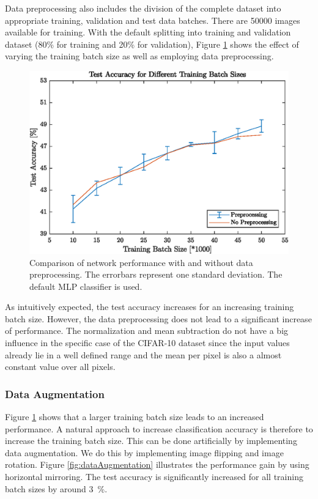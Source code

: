   	Data preprocessing also includes the division of the complete dataset into appropriate training, validation and test data batches. There are 50000 images available for training. With the default splitting into training and validation dataset (80\% for training and 20\% for validation), Figure \ref{fig:dataPreprocessing} shows the effect of varying the training batch size as well as employing data preprocessing.

  	\begin{figure}
  		\centering
   		\includegraphics{images/dataPreprocessing}
   		\caption{Comparison of network performance with and without data preprocessing. The errorbars represent one standard deviation. The default MLP classifier is used.}
   		\label{fig:dataPreprocessing}
   	\end{figure}

   	As intuitively expected, the test accuracy increases for an increasing training batch size. However, the data preprocessing does not lead to a significant increase of performance. The normalization and mean subtraction do not have a big influence in the specific case of the CIFAR-10 dataset since the input values already lie in a well defined range and the mean per pixel is also a almost constant value over all pixels.

\subsubsection{Data Augmentation}

Figure \ref{fig:dataPreprocessing} shows that a larger training batch size leads to an increased performance. A natural approach to increase classification accuracy is therefore to increase the training batch size. This can be done artificially by implementing data augmentation. We do this by implementing image flipping and image rotation. Figure \ref{fig:dataAugmentation} illustrates the performance gain by using horizontal mirroring. The test accuracy is significantly increased for all training batch sizes by around \SI{3}{\percent}.

